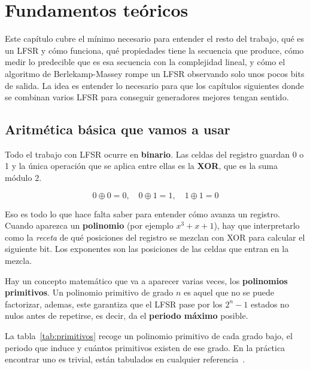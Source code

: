\chapter{Fundamentos teóricos}
\label{cap:fundamentos}

Este capítulo cubre el mínimo necesario para entender el resto del trabajo, qué es un LFSR y cómo funciona,
qué propiedades tiene la secuencia que produce, cómo medir lo predecible que es esa secuencia con la complejidad lineal,
y cómo el algoritmo de Berlekamp-Massey rompe un LFSR observando solo unos pocos bits de salida.
La idea es entender lo necesario para que los capítulos siguientes donde se combinan varios LFSR para conseguir generadores mejores tengan sentido.

\section{Aritmética básica que vamos a usar}

Todo el trabajo con LFSR ocurre en \textbf{binario}. Las celdas del registro guardan 0 o 1 y la única operación que se aplica entre ellas es la \textbf{XOR},
que es la suma módulo 2.

\[
  0 \oplus 0 = 0, \quad 0 \oplus 1 = 1, \quad 1 \oplus 1 = 0
\]

Eso es todo lo que hace falta saber para entender cómo avanza un registro. Cuando aparezca un \textbf{polinomio} (por ejemplo $x^3 + x + 1$),
hay que interpretarlo como la \textit{receta} de qué posiciones del registro se mezclan con XOR para calcular el siguiente bit.
Los exponentes son las posiciones de las celdas que entran en la mezcla.

Hay un concepto matemático que va a aparecer varias veces, los \textbf{polinomios primitivos}.
Un polinomio primitivo de grado $n$ es aquel que no se puede factorizar, ademas, este garantiza que el LFSR pase por los $2^n - 1$ estados no nulos antes de repetirse,
es decir, da el \textbf{periodo máximo} posible.

La tabla~\ref{tab:primitivos} recoge un polinomio primitivo de cada grado bajo, el periodo que induce
y cuántos primitivos existen de ese grado. En la práctica encontrar uno es trivial,
están tabulados en cualquier referencia~\cite{menezes1996}.

